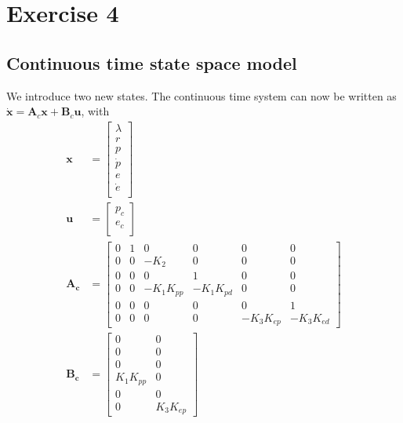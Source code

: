 
\section{Exercise 4}
\subsection{Continuous time state space model}
We introduce two new states. The continuous time system can now be written as $\mathbf{\dot{x}} = \mathbf{A}_c\mathbf{x}+ \mathbf{B}_c \mathbf{u}$, with
\begin{subequations}
    \begin{align}
        \mathbf{x} &= \begin{bmatrix}
            \lambda\\
            r\\
            p\\
            \dot{p}\\
            e\\
            \dot{e}\\
        \end{bmatrix}\\
        \mathbf{u} &= \begin{bmatrix}
            p_c\\
            e_c\\
        \end{bmatrix}\\
    \mathbf{A_c} &= \begin{bmatrix}
        0 & 1 & 0          & 0          & 0          & 0         \\
        0 & 0 & -K_2       & 0          & 0          & 0         \\
        0 & 0 & 0          & 1          & 0          & 0         \\
        0 & 0 & -K_1K_{pp} & -K_1K_{pd} & 0          & 0         \\
        0 & 0 & 0          & 0          & 0          & 1         \\
        0 & 0 & 0          & 0          & -K_3K_{ep} & -K_3K_{ed}
    \end{bmatrix}\\
    \mathbf{B_c} &= \begin{bmatrix}
        0         & 0        \\
        0         & 0        \\
        0         & 0        \\
        K_1K_{pp} & 0        \\
        0         & 0        \\
        0         & K_3K_{ep}
    \end{bmatrix}
    \end{align}
\end{subequations}
